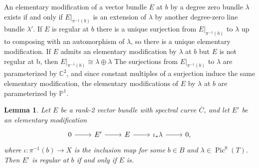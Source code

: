 \documentclass{article}[12pt]
\newtheorem{lemma}[theorem]{Lemma}
\theoremstyle{definition}
\theoremstyle{remark}
\newcommand \C{\mathbb C}
\numberwithin{equation}{section}
\newcommand \mb{\mathbb}
\DeclareMathOperator{\Pic}{Pic}
\begin{document}
An elementary modification of a vector bundle $E$ at $b$ by a degree zero bundle $\lambda$ exists if and only if $E|_{\pi^{-1}(b)}$ is an extension of $\lambda$ by another degree-zero line bundle $\lambda'$. If $E$ is regular at $b$ there is a unique surjection from $E|_{\pi^{-1}(b)}$ to $\lambda$ up to composing with an automorphism of $\lambda$, so there is a unique elementary modification. If $E$ admits an elementary modification by $\lambda$ at $b$ but $E$ is not regular at b, then $E|_{\pi^{-1}(b)}\cong \lambda\oplus \lambda$ The surjections from $E|_{\pi^{-1}(b)}$ to $\lambda$ are parameterized by $\C^2$, and since constant multiples of a surjection induce the same elementary modification, the elementary modifications of $E$ by $\lambda$ at $b$ are parameterized by $\mb{P}^1$. 
\begin{lemma}\label{regular}
	Let $E$ be a rank-2 vector bundle with spectral curve $\overline{C}$, and let $E'$ be an elementary modification
	\begin{equation}\label{reg}\begin{tikzcd} 0 \arrow[r] & E' \arrow[r] & E \arrow[r] & \iota_*\lambda \arrow[r] & 0,
	\end{tikzcd}\end{equation}
	where $\iota:\pi^{-1}(b) \to X$ is the inclusion map for some $b \in B$ and $\lambda \in \Pic^0(T)$. Then $E'$ is regular at $b$ if and only if $E$ is.
\end{lemma}
\end{document}
